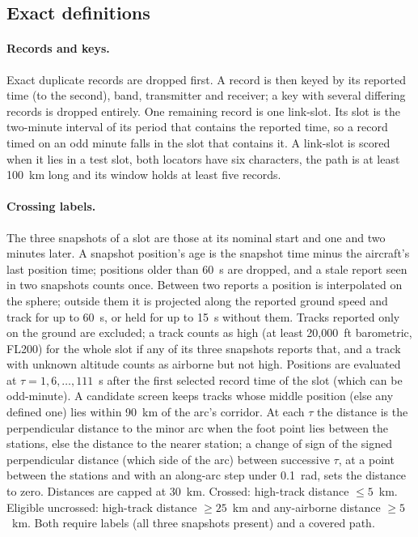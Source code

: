 \documentclass[11pt]{article}
\begin{document}
\begin{appendices}
\section{Exact definitions}\label{app:defs}

\paragraph{Records and keys.} Exact duplicate records are dropped first. A record is then keyed by its reported time (to the second), band, transmitter and receiver; a key with several differing records is dropped entirely. One remaining record is one link-slot. Its slot is the two-minute interval of its period that contains the reported time, so a record timed on an odd minute falls in the slot that contains it. A link-slot is scored when it lies in a test slot, both locators have six characters, the path is at least 100~km long and its window holds at least five records.

\paragraph{Crossing labels.} The three snapshots of a slot are those at its nominal start and one and two minutes later. A snapshot position's age is the snapshot time minus the aircraft's last position time; positions older than 60~s are dropped, and a stale report seen in two snapshots counts once. Between two reports a position is interpolated on the sphere; outside them it is projected along the reported ground speed and track for up to 60~s, or held for up to 15~s without them. Tracks reported only on the ground are excluded; a track counts as high (at least 20{,}000~ft barometric, FL200) for the whole slot if any of its three snapshots reports that, and a track with unknown altitude counts as airborne but not high. Positions are evaluated at $\tau=1,6,\ldots,111$~s after the first selected record time of the slot (which can be odd-minute). A candidate screen keeps tracks whose middle position (else any defined one) lies within 90~km of the arc's corridor. At each $\tau$ the distance is the perpendicular distance to the minor arc when the foot point lies between the stations, else the distance to the nearer station; a change of sign of the signed perpendicular distance (which side of the arc) between successive $\tau$, at a point between the stations and with an along-arc step under 0.1~rad, sets the distance to zero. Distances are capped at 30~km. Crossed: high-track distance $\le5$~km. Eligible uncrossed: high-track distance $\ge25$~km and any-airborne distance $\ge5$~km. Both require labels (all three snapshots present) and a covered path.


\end{appendices}
\end{document}
